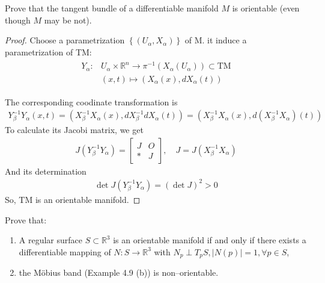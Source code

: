 \begin{Exercise}
    Prove that the tangent bundle of a differentiable manifold $M$ is orientable (even though $M$ may be not).
\end{Exercise}
\begin{proof}
    Choose a parametrization $\left\{\left( U_\alpha, X_\alpha\right)\right\}$ of M. it induce a parametrization of TM:
\begin{align*}
\begin{aligned}
 Y_\alpha : & U_\alpha \times\mathbb{R}^n \rightarrow \pi^{-1}\left(X_\alpha\left(U_\alpha\right)\right)\subset \textrm{TM} \\
& (x, t) \mapsto\left(X_\alpha(x), d X_\alpha(t)\right)
\end{aligned}
\end{align*}

The corresponding coodinate transformation is
\begin{align*}
Y_\beta^{-1} Y_\alpha(x, t)=\left(X_\beta^{-1} X_\alpha(x), d X_\beta^{-1} d X_\alpha(t)\right)=\left(X_\beta^{-1} X_\alpha(x), d\left(X_\beta^{-1} X_\alpha\right)(t)\right)
\end{align*}
To calculate its Jacobi matrix, we get
\begin{align*}
J\left(Y_\beta^{-1} Y_\alpha\right)=\left[\begin{array}{cc}
J & O \\
* & J
\end{array}\right], \quad J=J\left(X_\beta^{-1} X_\alpha\right)
\end{align*}
And its determination
\begin{align*}
\operatorname{det} J\left(Y_\beta^{-1} Y_\alpha\right)=(\operatorname{det} J)^2>0
\end{align*}
So, TM is an orientable manifold.
\end{proof}

\begin{Exercise}
    Prove that:
    \begin{enumerate}[label=(\alph*)]
        \item A regular surface $S \subset \mathbb{R}^3$ is an orientable manifold if and only if there exists a differentiable mapping of $N: S \rightarrow \mathbb{R}^3$ with $N_p \perp T_p S,\left|N(p)\right|=1, \forall p \in S$,
        \item the M\"{o}bius band (Example 4.9 (b)) is non--orientable.
    \end{enumerate}
\end{Exercise}

